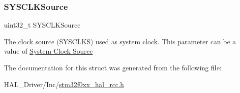 \subsubsection{\texorpdfstring{S\+Y\+S\+C\+L\+K\+Source}{SYSCLKSource}}
{\footnotesize\ttfamily uint32\+\_\+t S\+Y\+S\+C\+L\+K\+Source}

The clock source (S\+Y\+S\+C\+L\+KS) used as system clock. This parameter can be a value of \hyperlink{group___r_c_c___system___clock___source}{System Clock Source} 

The documentation for this struct was generated from the following file\+:\begin{DoxyCompactItemize}
\item 
H\+A\+L\+\_\+\+Driver/\+Inc/\hyperlink{stm32f0xx__hal__rcc_8h}{stm32f0xx\+\_\+hal\+\_\+rcc.\+h}\end{DoxyCompactItemize}
